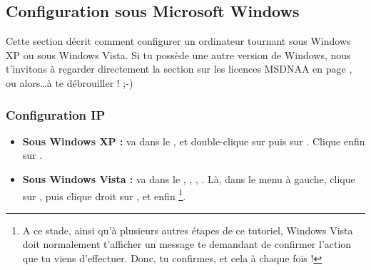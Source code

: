 

\clearpage

\subsection{Configuration sous Microsoft Windows}

Cette section décrit comment configurer un ordinateur tournant sous Windows XP ou sous Windows Vista. Si tu possède une autre version de Windows,
nous t'invitons à regarder directement la section sur les licences MSDNAA en page \pageref{msdnaa}, ou alors\dots à te débrouiller ! ;-)

\subsubsection{Configuration IP}

\begin{itemize}

\item \textbf{Sous Windows XP :} va dans le ,  et double-clique sur  puis sur . Clique enfin sur .

\item \textbf{Sous Windows Vista :} va dans le , , , . Là, dans le menu à gauche, clique sur , puis clique droit sur , et enfin \footnote{A ce stade, ainsi qu'à plusieurs autres étapes de ce tutoriel, Windows Vista doit normalement t'afficher un message te demandant de confirmer l'action que tu viens d'effectuer. Donc, tu confirmes, et cela à chaque fois !}.

\end{itemize}





